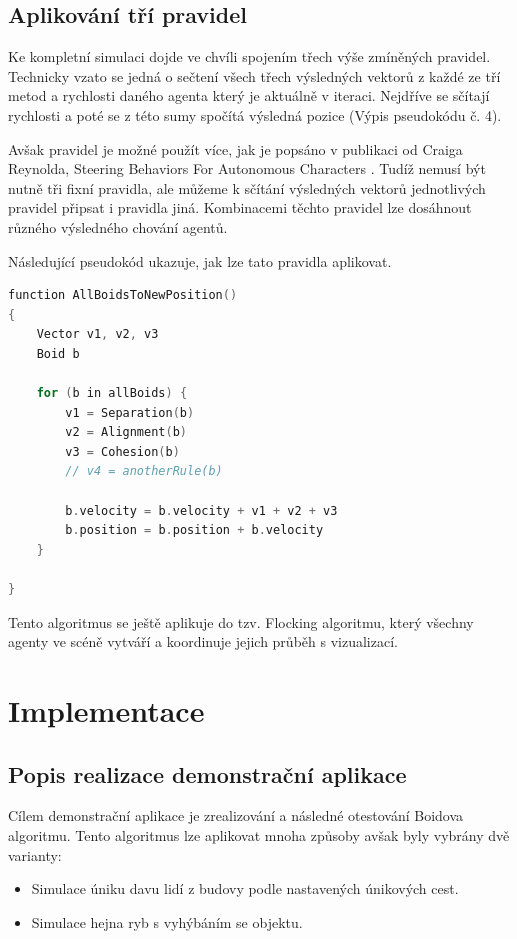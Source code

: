 \documentclass[czech,public,dept460,male,cpdeclaration]{diploma}
\begin{document}
\subsection{Aplikování tří pravidel}\label{sec:aplikovani-tri-pravidel}
Ke kompletní simulaci dojde ve chvíli spojením třech výše zmíněných pravidel. Technicky vzato se jedná o sečtení všech třech výsledných vektorů z každé ze tří metod a rychlosti daného agenta který je aktuálně v iteraci. Nejdříve se sčítají rychlosti a poté se z této sumy spočítá výsledná pozice (Výpis pseudokódu č. 4).

Avšak pravidel je možné použít více, jak je popsáno v publikaci od Craiga Reynolda, Steering Behaviors For Autonomous Characters \cite{linkToSteeringBehaviors}. Tudíž nemusí být nutně tři fixní pravidla, ale můžeme k sčítání výsledných vektorů jednotlivých pravidel připsat i pravidla jiná. Kombinacemi těchto pravidel lze dosáhnout různého výsledného chování agentů.

Následující pseudokód ukazuje, jak lze tato pravidla aplikovat.

\begin{lstlisting}[language=c++,label=src:Flocking pseudocode,caption=Pseudokód pro aplikování třech pravidel]
function AllBoidsToNewPosition()
{
	Vector v1, v2, v3
	Boid b
	
	for (b in allBoids) {
		v1 = Separation(b)
		v2 = Alignment(b)
		v3 = Cohesion(b)
		// v4 = anotherRule(b)
		
		b.velocity = b.velocity + v1 + v2 + v3
		b.position = b.position + b.velocity
	}

}
\end{lstlisting}

Tento algoritmus se ještě aplikuje do tzv. Flocking algoritmu, který všechny agenty ve scéně vytváří a koordinuje jejich průběh s vizualizací.

\newpage
\section{Implementace}

\subsection{Popis realizace demonstrační aplikace}
Cílem demonstrační aplikace je zrealizování a následné otestování Boidova algoritmu. Tento algoritmus lze aplikovat mnoha způsoby avšak byly vybrány dvě varianty:

\begin{itemize}
	\item Simulace úniku davu lidí z budovy podle nastavených únikových cest.
	\item Simulace hejna ryb s vyhýbáním se objektu.
\end{itemize}
\end{document}
